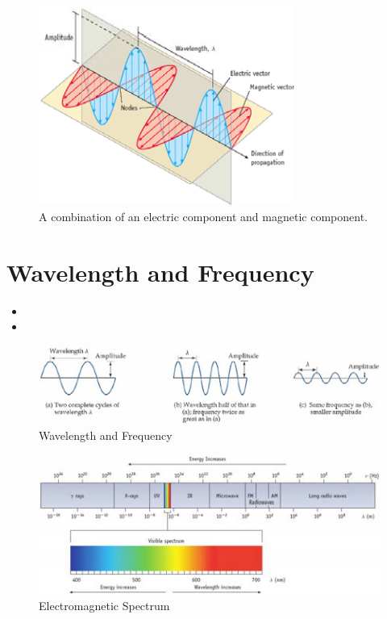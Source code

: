 \documentclass[
	chapter=7,
	title={Quantum Theory {\&} the Electronic Structure of Atoms},
	showanswers=true,
]{chem122notes}
\begin{document}
\begin{figure}[H]
	\centering
	\includegraphics[width=0.75\textwidth]{chapter7/electric-magnetic-components}
	\caption{A combination of an electric component and magnetic component.}
	\label{fig:electric-magnetic-components}
\end{figure}

\section{Wavelength and Frequency}\label{sec:wavelength-and-frequency}
\begin{itemize}
	\item {}
	\item {}
\end{itemize}

\begin{figure}[H]
	\centering
	\includegraphics[width=\textwidth]{chapter7/wavelength_frequency}
	\caption{Wavelength and Frequency}
	\label{fig:wavelength-frequency}
\end{figure}

\begin{figure}[H]
	\centering
	\includegraphics[width=\textwidth]{chapter7/electromagnetic-spectrum}
	\caption{Electromagnetic Spectrum}
	\label{fig:electromagnetic-spectrum}
\end{figure}
\end{document}
